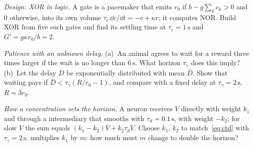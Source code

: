 \begin{exercise}[\lvlB]
\label{ex:05:6}
\emph{Design: XOR in  logic.} A gate is a pacemaker that emits $r_0$ if $b-g\sum_kc_k>0$ and $0$ otherwise, into its own volume $\tau_c\,\dd c/\dd t=-c+\kappa r$; it computes NOR. Build XOR from five such gates and find its settling time at $\tau_c=1\,\text{s}$ and $G'=g\kappa r_0/b=2$.
\end{exercise}

\begin{exercise}[\lvlB]
\label{ex:05:7}
\emph{Patience with an unknown delay.} (a)~An animal agrees to wait for a reward three times larger if the wait is no longer than $6\,\text{s}$. What horizon $\tau_\gamma$ does this imply? (b)~Let the delay $D$ be exponentially distributed with mean $\bar D$. Show that waiting pays if $\bar D<\tau_\gamma(R/r_0-1)$, and compare with a fixed delay at $\tau_\gamma=2\,\text{s}$, $R=3r_0$.
\end{exercise}

\begin{exercise}[\lvlC]
\label{ex:05:8}
\emph{How a concentration sets the horizon.} A  neuron receives $V$ directly with weight $k_1$ and through a  intermediary that smooths with $\tau_d=0.1\,\text{s}$, with weight $-k_2$; for slow $V$ the sum equals $(k_1-k_2)V+k_2\tau_d\dot V$. Choose $k_1$, $k_2$ to match~\eqref{eq:ctd} with $\tau_\gamma=2\,\text{s}$.  multiplies $k_1$ by $m$: how much must $m$ change to double the horizon?
\end{exercise}
